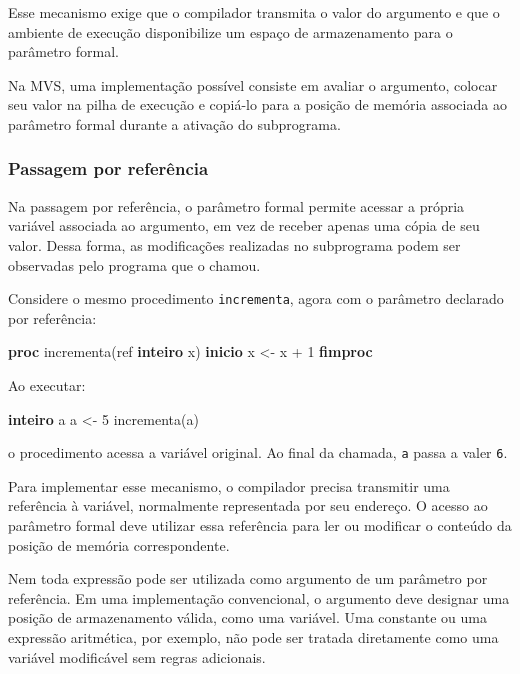 \documentclass[
  brazilian,
  letterpaper,
]{book}
\newenvironment{Shaded}{\begin{snugshade}}{\end{snugshade}}
\newcommand{\DecValTok}[1]{\textcolor[rgb]{0.68,0.00,0.00}{#1}}
\newcommand{\KeywordTok}[1]{\textcolor[rgb]{0.00,0.23,0.31}{\textbf{#1}}}
\newcommand{\NormalTok}[1]{\textcolor[rgb]{0.00,0.23,0.31}{#1}}
\theoremstyle{plain}
\theoremstyle{definition}
\theoremstyle{remark}
\begin{document}
Esse mecanismo exige que o compilador transmita o valor do argumento e
que o ambiente de execução disponibilize um espaço de armazenamento para
o parâmetro formal.

Na MVS, uma implementação possível consiste em avaliar o argumento,
colocar seu valor na pilha de execução e copiá-lo para a posição de
memória associada ao parâmetro formal durante a ativação do subprograma.

\subsubsection{Passagem por
referência}\label{passagem-por-referuxeancia}

Na passagem por referência, o parâmetro formal permite acessar a própria
variável associada ao argumento, em vez de receber apenas uma cópia de
seu valor. Dessa forma, as modificações realizadas no subprograma podem
ser observadas pelo programa que o chamou.

Considere o mesmo procedimento \texttt{incrementa}, agora com o
parâmetro declarado por referência:

\begin{Shaded}
\begin{Highlighting}[]
\KeywordTok{proc}\NormalTok{ incrementa(ref }\KeywordTok{inteiro}\NormalTok{ x)}
\KeywordTok{inicio}
\NormalTok{    x \textless{}{-} x + }\DecValTok{1}
\KeywordTok{fimproc}
\end{Highlighting}
\end{Shaded}

Ao executar:

\begin{Shaded}
\begin{Highlighting}[]
\KeywordTok{inteiro}\NormalTok{ a}
\NormalTok{a \textless{}{-} }\DecValTok{5}
\NormalTok{incrementa(a)}
\end{Highlighting}
\end{Shaded}

o procedimento acessa a variável original. Ao final da chamada,
\texttt{a} passa a valer \texttt{6}.

Para implementar esse mecanismo, o compilador precisa transmitir uma
referência à variável, normalmente representada por seu endereço. O
acesso ao parâmetro formal deve utilizar essa referência para ler ou
modificar o conteúdo da posição de memória correspondente.

Nem toda expressão pode ser utilizada como argumento de um parâmetro por
referência. Em uma implementação convencional, o argumento deve designar
uma posição de armazenamento válida, como uma variável. Uma constante ou
uma expressão aritmética, por exemplo, não pode ser tratada diretamente
como uma variável modificável sem regras adicionais.
\end{document}

